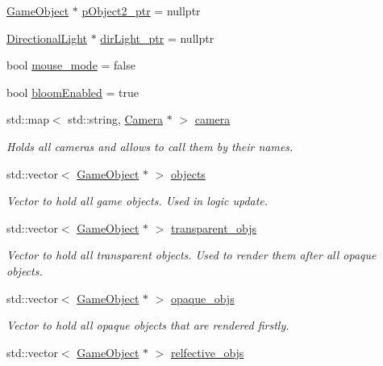 \begin{DoxyCompactItemize}
\item 
\mbox{\hyperlink{class_game_object}{Game\+Object}} $\ast$ \mbox{\hyperlink{class_game_a9d8260c3af3cadc4175b9d6fdbd60fd9}{p\+Object2\+\_\+ptr}} = nullptr
\item 
\mbox{\hyperlink{class_directional_light}{Directional\+Light}} $\ast$ \mbox{\hyperlink{class_game_abf59c36fc2002f081db238c0c59d281c}{dir\+Light\+\_\+ptr}} = nullptr
\item 
bool \mbox{\hyperlink{class_game_a2ba304fc1c700d96594813ea8be1fab4}{mouse\+\_\+mode}} = false
\item 
bool \mbox{\hyperlink{class_game_aebb0f727637f73a434faf0418cff1cc8}{bloom\+Enabled}} = true
\item 
std\+::map$<$ std\+::string, \mbox{\hyperlink{class_camera}{Camera}} $\ast$ $>$ \mbox{\hyperlink{class_game_af4eb1b9c217dcb0f860ec9b0320f2274}{camera}}
\begin{DoxyCompactList}\small\item\em Holds all cameras and allows to call them by their names. \end{DoxyCompactList}\item 
std\+::vector$<$ \mbox{\hyperlink{class_game_object}{Game\+Object}} $\ast$ $>$ \mbox{\hyperlink{class_game_ac025aa21d226a5beb9ba19bc418af894}{objects}}
\begin{DoxyCompactList}\small\item\em Vector to hold all game objects. Used in logic update. \end{DoxyCompactList}\item 
std\+::vector$<$ \mbox{\hyperlink{class_game_object}{Game\+Object}} $\ast$ $>$ \mbox{\hyperlink{class_game_a29149a40296ca49ec4aacdad04716fe4}{transparent\+\_\+objs}}
\begin{DoxyCompactList}\small\item\em Vector to hold all transparent objects. Used to render them after all opaque objects. \end{DoxyCompactList}\item 
std\+::vector$<$ \mbox{\hyperlink{class_game_object}{Game\+Object}} $\ast$ $>$ \mbox{\hyperlink{class_game_affc1bb149ae6c474261ba1bfe133af07}{opaque\+\_\+objs}}
\begin{DoxyCompactList}\small\item\em Vector to hold all opaque objects that are rendered firstly. \end{DoxyCompactList}\item 
std\+::vector$<$ \mbox{\hyperlink{class_game_object}{Game\+Object}} $\ast$ $>$ \mbox{\hyperlink{class_game_aeb28e11f6ddb7c1226a42e59c1d7817b}{relfective\+\_\+objs}}

\end{DoxyCompactItemize}
